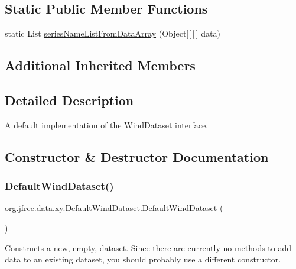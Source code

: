 \subsection*{Static Public Member Functions}
\begin{DoxyCompactItemize}
\item 
static List \mbox{\hyperlink{classorg_1_1jfree_1_1data_1_1xy_1_1_default_wind_dataset_a86786eeca04c54e0330366e05fd5f5b4}{series\+Name\+List\+From\+Data\+Array}} (Object\mbox{[}$\,$\mbox{]}\mbox{[}$\,$\mbox{]} data)
\end{DoxyCompactItemize}
\subsection*{Additional Inherited Members}


\subsection{Detailed Description}
A default implementation of the \mbox{\hyperlink{interfaceorg_1_1jfree_1_1data_1_1xy_1_1_wind_dataset}{Wind\+Dataset}} interface. 

\subsection{Constructor \& Destructor Documentation}
\mbox{\label{classorg_1_1jfree_1_1data_1_1xy_1_1_default_wind_dataset_aac34ccb95e5cf373f6cb2a22993db505}} 
\subsubsection{\texorpdfstring{Default\+Wind\+Dataset()}{DefaultWindDataset()}\hspace{0.1cm}{\footnotesize\ttfamily [1/4]}}
{\footnotesize\ttfamily org.\+jfree.\+data.\+xy.\+Default\+Wind\+Dataset.\+Default\+Wind\+Dataset (\begin{DoxyParamCaption}{ }\end{DoxyParamCaption})}

Constructs a new, empty, dataset. Since there are currently no methods to add data to an existing dataset, you should probably use a different constructor. \mbox{\label{classorg_1_1jfree_1_1data_1_1xy_1_1_default_wind_dataset_abbb7ce3f458389d28ca99312bc824ec9}} 
